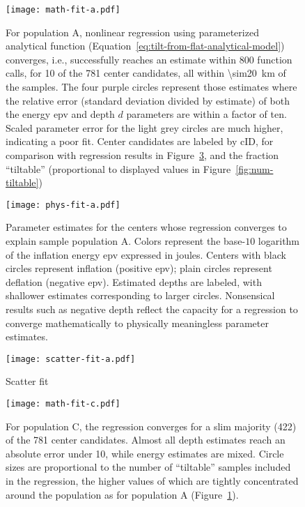 \begin{figure}
    \texttt{[image: math-fit-a.pdf]}%
    \caption[Population A: Goodness of Fit]{For population A, nonlinear regression using parameterized analytical function (Equation~\eqref{eq:tilt-from-flat-analytical-model}) converges, i.e., successfully reaches an estimate within 800 function calls, for 10 of the 781 center candidates, all within \qty{\sim20}{\km} of the samples. The four purple circles represent those estimates where the relative error (standard deviation divided by estimate) of both the energy \acs{epv} and depth $d$ parameters are within a factor of ten. Scaled parameter error for the light grey circles are much higher, indicating a poor fit. Center candidates are labeled by cID, for comparison with regression results in Figure~\ref{fig:scatter-fit-a}, and the fraction ``tiltable'' (proportional to displayed values in Figure~\ref{fig:num-tiltable})}%
    \label{fig:math-fit-a}
\end{figure}

\begin{figure}
    \texttt{[image: phys-fit-a.pdf]}%
    \caption[Population A: Parameter Estimates]{Parameter estimates for the centers whose regression converges to explain sample population A. Colors represent the base-$10$ logarithm of the inflation energy \acs{epv} expressed in joules. Centers with black circles represent inflation (positive \acs{epv}); plain circles represent deflation (negative \acs{epv}). Estimated depths are labeled, with shallower estimates corresponding to larger circles. Nonsensical results such as negative depth reflect the capacity for a regression to converge mathematically to physically meaningless parameter estimates.}%
    \label{fig:phys-fit-a}
\end{figure}

\begin{figure}
    \texttt{[image: scatter-fit-a.pdf]}%
    \caption[Scatter Plot for Select Center Candidates: Population A]{Scatter fit}%
    \label{fig:scatter-fit-a}
\end{figure}

\begin{figure}
    \texttt{[image: math-fit-c.pdf]}
    \caption[Population C: Goodness of Fit]{For population C, the regression converges for a slim majority (422) of the 781 center candidates. Almost all depth estimates reach an absolute error under 10, while energy estimates are mixed. Circle sizes are proportional to the number of ``tiltable'' samples included in the regression, the higher values of which are tightly concentrated around the population as for population A (Figure~\ref{fig:math-fit-a}).}%
    \label{fig:math-fit-c}
\end{figure}

